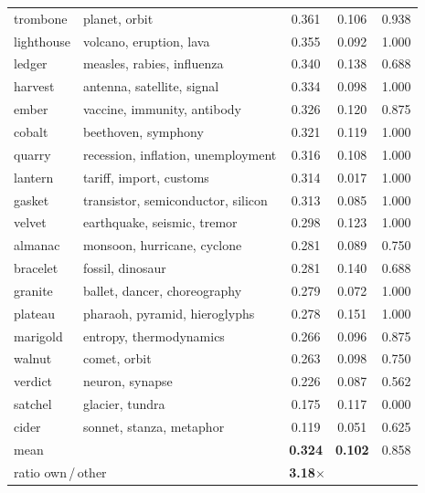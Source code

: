 \begin{table}[t]
\begin{tabular}{@{}llccc@{}}
trombone    & planet, orbit                      & 0.361 & 0.106 & 0.938 \\
lighthouse  & volcano, eruption, lava            & 0.355 & 0.092 & 1.000 \\
ledger      & measles, rabies, influenza         & 0.340 & 0.138 & 0.688 \\
harvest     & antenna, satellite, signal         & 0.334 & 0.098 & 1.000 \\
ember       & vaccine, immunity, antibody        & 0.326 & 0.120 & 0.875 \\
cobalt      & beethoven, symphony                & 0.321 & 0.119 & 1.000 \\
quarry      & recession, inflation, unemployment & 0.316 & 0.108 & 1.000 \\
lantern     & tariff, import, customs            & 0.314 & 0.017 & 1.000 \\
gasket      & transistor, semiconductor, silicon & 0.313 & 0.085 & 1.000 \\
velvet      & earthquake, seismic, tremor        & 0.298 & 0.123 & 1.000 \\
almanac     & monsoon, hurricane, cyclone        & 0.281 & 0.089 & 0.750 \\
bracelet    & fossil, dinosaur                   & 0.281 & 0.140 & 0.688 \\
granite     & ballet, dancer, choreography       & 0.279 & 0.072 & 1.000 \\
plateau     & pharaoh, pyramid, hieroglyphs      & 0.278 & 0.151 & 1.000 \\
marigold    & entropy, thermodynamics            & 0.266 & 0.096 & 0.875 \\
walnut      & comet, orbit                       & 0.263 & 0.098 & 0.750 \\
verdict     & neuron, synapse                    & 0.226 & 0.087 & 0.562 \\
satchel     & glacier, tundra                    & 0.175 & 0.117 & 0.000 \\
cider       & sonnet, stanza, metaphor           & 0.119 & 0.051 & 0.625 \\
\midrule
mean & & \textbf{0.324} & \textbf{0.102} & 0.858 \\
\multicolumn{2}{l}{ratio own\,/\,other} & \multicolumn{3}{l}{\textbf{3.18$\times$}} \\
\bottomrule
\end{tabular}
\end{table}
